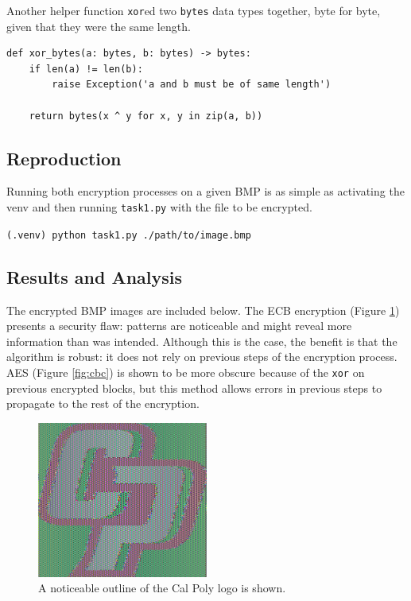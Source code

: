 \documentclass[11pt]{article}
\begin{document}
Another helper function {\tt xor}ed two {\tt bytes} data types together, byte for byte, given that they were the same length.

\begin{framed}
\begin{verbatim}
def xor_bytes(a: bytes, b: bytes) -> bytes:
    if len(a) != len(b):
        raise Exception('a and b must be of same length')
    
    return bytes(x ^ y for x, y in zip(a, b))
\end{verbatim}
\end{framed}

\subsection*{Reproduction}

Running both encryption processes on a given BMP is as simple as activating the venv and then running \verb|task1.py| with the file to be encrypted.

\verb|(.venv) python task1.py ./path/to/image.bmp|

\subsection*{Results and Analysis}

The encrypted BMP images are included below. The ECB encryption (Figure \ref{fig:ecb}) presents a security flaw: patterns are noticeable and might reveal more information than was intended. Although this is the case, the benefit is that the algorithm is robust: it does not rely on previous steps of the encryption process. AES (Figure \ref{fig:cbc}) is shown to be more obscure because of the \verb|xor| on previous encrypted blocks, but this method allows errors in previous steps to propagate to the rest of the encryption.

\begin{figure}[!ht]
	\centering
	\includegraphics[width=0.5\textwidth]{./assets/ecb_encrypted.jpg}
	\caption{A noticeable outline of the Cal Poly logo is shown.}
	\label{fig:ecb}
\end{figure}
\end{document}
